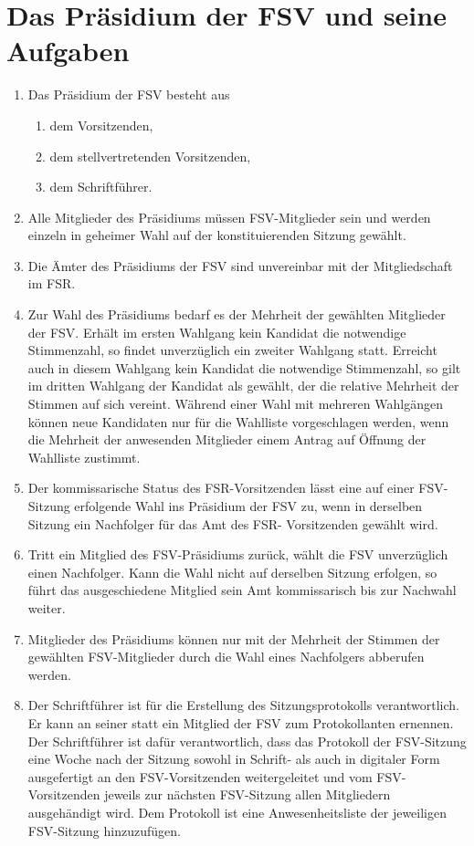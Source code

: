 \documentclass{article}
\begin{document}
\section{Das Präsidium der FSV und seine Aufgaben}
\begin{enumerate}[(1)]
	\item Das Präsidium der FSV besteht aus
	\begin{enumerate}[1.]
		\item dem Vorsitzenden,
		\item dem stellvertretenden Vorsitzenden,
		\item dem Schriftführer.
	\end{enumerate}
    \item Alle Mitglieder des Präsidiums müssen FSV-Mitglieder sein und werden einzeln in geheimer Wahl auf der konstituierenden Sitzung gewählt.
    \item Die Ämter des Präsidiums der FSV sind unvereinbar mit der Mitgliedschaft im FSR.
	\item Zur Wahl des Präsidiums bedarf es der Mehrheit der gewählten Mitglieder der FSV. Erhält im ersten Wahlgang kein Kandidat die notwendige Stimmenzahl, so findet unverzüglich ein zweiter Wahlgang statt. Erreicht auch in diesem Wahlgang kein Kandidat die notwendige Stimmenzahl, so gilt im dritten Wahlgang der Kandidat als gewählt, der die relative Mehrheit der Stimmen auf sich vereint. Während einer Wahl mit mehreren Wahlgängen können neue Kandidaten nur für die Wahlliste vorgeschlagen werden, wenn die Mehrheit der anwesenden Mitglieder einem Antrag auf Öffnung der Wahlliste zustimmt.
	\item Der kommissarische Status des FSR-Vorsitzenden lässt eine auf einer FSV-Sitzung erfolgende Wahl ins Präsidium der FSV zu, wenn in derselben Sitzung ein Nachfolger für das Amt des FSR- Vorsitzenden gewählt wird.
	\item Tritt ein Mitglied des FSV-Präsidiums zurück, wählt die FSV unverzüglich einen Nachfolger. Kann die Wahl nicht auf derselben Sitzung erfolgen, so führt das ausgeschiedene Mitglied sein Amt kommissarisch bis zur Nachwahl weiter.
	\item Mitglieder des Präsidiums können nur mit der Mehrheit der Stimmen der gewählten FSV-Mitglieder durch die Wahl eines Nachfolgers abberufen werden.
	\item Der Schriftführer ist für die Erstellung des Sitzungsprotokolls verantwortlich. Er kann an seiner statt ein Mitglied der FSV zum Protokollanten ernennen. Der Schriftführer ist dafür verantwortlich, dass das Protokoll der FSV-Sitzung eine Woche nach der Sitzung sowohl in Schrift- als auch in digitaler Form ausgefertigt an den FSV-Vorsitzenden weitergeleitet und vom FSV-Vorsitzenden jeweils zur nächsten FSV-Sitzung allen Mitgliedern ausgehändigt wird. Dem Protokoll ist eine Anwesenheitsliste der jeweiligen FSV-Sitzung hinzuzufügen.

\end{enumerate}
\end{document}
